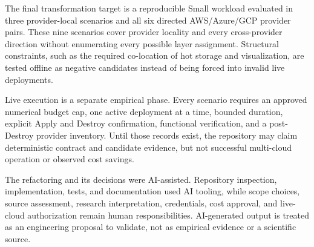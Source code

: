The final transformation target is a reproducible Small workload evaluated in
three provider-local scenarios and all six directed AWS/Azure/GCP provider
pairs. These nine scenarios cover provider locality and every cross-provider
direction without enumerating every possible layer assignment. Structural
constraints, such as the required co-location of hot storage and visualization,
are tested offline as negative candidates instead of being forced into invalid
live deployments.

Live execution is a separate empirical phase. Every scenario requires an
approved numerical budget cap, one active deployment at a time, bounded
duration, explicit Apply and Destroy confirmation, functional verification,
and a post-Destroy provider inventory. Until those records exist, the
repository may claim deterministic contract and candidate evidence, but not
successful multi-cloud operation or observed cost savings.

The refactoring and its decisions were AI-assisted. Repository inspection,
implementation, tests, and documentation used AI tooling, while scope choices,
source assessment, research interpretation, credentials, cost approval, and
live-cloud authorization remain human responsibilities. AI-generated output is
treated as an engineering proposal to validate, not as empirical evidence or a
scientific source.
